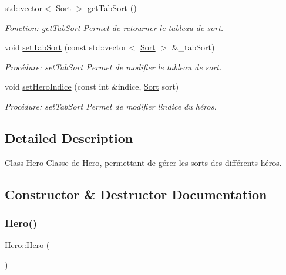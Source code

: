 \begin{DoxyCompactItemize}
std\+::vector$<$ \hyperlink{classSort}{Sort} $>$ \hyperlink{classHero_ab596535fb4e3aeb836bd23780220455b}{get\+Tab\+Sort} ()
\begin{DoxyCompactList}\small\item\em Fonction\+: get\+Tab\+Sort Permet de retourner le tableau de sort. \end{DoxyCompactList}\item 
void \hyperlink{classHero_ae7c967e805c745f63534fa342b395954}{set\+Tab\+Sort} (const std\+::vector$<$ \hyperlink{classSort}{Sort} $>$ \&\+\_\+tab\+Sort)
\begin{DoxyCompactList}\small\item\em Procédure\+: set\+Tab\+Sort Permet de modifier le tableau de sort. \end{DoxyCompactList}\item 
void \hyperlink{classHero_a48cd72ba539d261504a582a63d7c9e5f}{set\+Hero\+Indice} (const int \&indice, \hyperlink{classSort}{Sort} sort)
\begin{DoxyCompactList}\small\item\em Procédure\+: set\+Tab\+Sort Permet de modifier l\textquotesingle{}indice du héros. \end{DoxyCompactList}\end{DoxyCompactItemize}


\subsection{Detailed Description}
Class \hyperlink{classHero}{Hero} Classe de \hyperlink{classHero}{Hero}, permettant de gérer les sorts des différents héros. 

\subsection{Constructor \& Destructor Documentation}
\mbox{\label{classHero_ab5920677a4b5cb59d6f513922d037dca}} 
\subsubsection{\texorpdfstring{Hero()}{Hero()}\hspace{0.1cm}{\footnotesize\ttfamily [1/3]}}
{\footnotesize\ttfamily Hero\+::\+Hero (\begin{DoxyParamCaption}{ }\end{DoxyParamCaption})}



